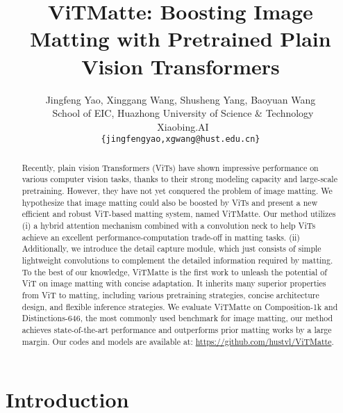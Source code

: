 \documentclass[10pt,twocolumn,letterpaper]{article}
\newcommand{\thename}{ViTMatte}
\begin{document}
\title{ViTMatte: Boosting Image Matting with Pretrained Plain Vision Transformers}

\author{
Jingfeng Yao,
Xinggang Wang,
Shusheng Yang,
Baoyuan Wang
\\
[2mm]
~School of EIC, Huazhong University of Science \& Technology\\ 
~Xiaobing.AI
\\ 
\normalsize{
\texttt{\{jingfengyao,xgwang@hust.edu.cn\}}}}

\maketitle

\let\thefootnote\relax{}

\begin{abstract}
Recently, plain vision Transformers (ViTs) have shown impressive performance on various computer vision tasks, thanks to their strong modeling capacity and large-scale pretraining. However, they have not yet conquered the problem of image matting. We hypothesize that image matting could also be boosted by ViTs and present a new efficient and robust ViT-based matting system, named \thename{}. Our method utilizes (i) a hybrid attention mechanism combined with a convolution neck to help ViTs achieve an excellent performance-computation trade-off in matting tasks. (ii) Additionally, we introduce the detail capture module, which just consists of simple lightweight convolutions to complement the detailed information required by matting. To the best of our knowledge, \thename{} is the first work to unleash the potential of ViT on image matting with concise adaptation. It inherits many superior properties from ViT to matting, including various pretraining strategies, concise architecture design, and flexible inference strategies. We evaluate \thename{} on Composition-1k and Distinctions-646, the most commonly used benchmark for image matting, our method achieves state-of-the-art performance and outperforms prior matting works by a large margin. Our codes and models are available at: \href{https://github.com/hustvl/ViTMatte}{https://github.com/hustvl/ViTMatte}.
\end{abstract}

\section{Introduction}
\end{document}
